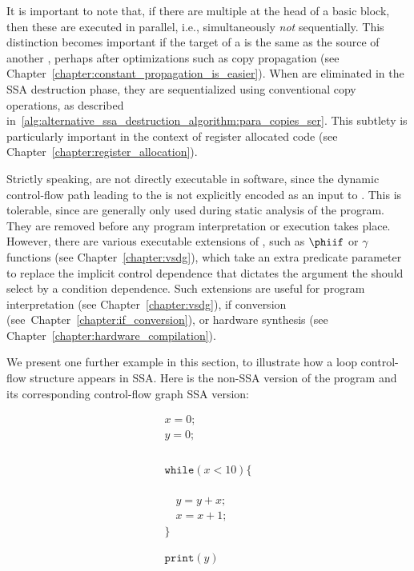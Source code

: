 It is important to note that, if there are multiple \phifuns{} at the head of a basic block, then these are executed in parallel, i.e., simultaneously \textit{not} sequentially. 
This distinction becomes important if the target of a \phifun is the same as the source of another \phifun, perhaps after optimizations such as copy propagation (see Chapter~\ref{chapter:constant_propagation_is_easier}). 
When \phifuns are eliminated in the SSA destruction phase, they are sequentialized using conventional copy operations, as described in~\ref{alg:alternative_ssa_destruction_algorithm:para_copies_ser}. 
This subtlety is particularly important in the context of register allocated code (see Chapter~\ref{chapter:register_allocation}).

Strictly speaking, \phifuns are not directly executable in software, since the dynamic control-flow path leading to the \phifun is not explicitly encoded as an input to \phifun. 
This is tolerable, since \phifuns are generally only used during static analysis of the program. 
They are removed before any program interpretation or execution takes place. 
However, there are various executable extensions of \phifuns, such as $\phiif$ or $\gamma$ functions (see Chapter~\ref{chapter:vsdg}), which take an extra predicate parameter to replace the implicit control dependence that dictates the argument the \phifun should select by a condition dependence. 
Such extensions are useful for program interpretation (see Chapter~\ref{chapter:vsdg}), if conversion (see~Chapter~\ref{chapter:if_conversion}), or hardware synthesis (see Chapter~\ref{chapter:hardware_compilation}).

We present one further example in this section, to illustrate how a loop control-flow structure appears in SSA. 
Here is the non-SSA version of the program and its corresponding control-flow graph SSA version:
\medskip

\begin{minipage}{0.5\textwidth}
\begin{equation*}
\begin{array}{l}
x = 0;\\
y = 0;\\
~\\\\\\\\
\texttt{while} (x < 10) \{\\
~\\\\\\
\quad  y = y + x;\\
\quad  x = x + 1;\\
\}\\
~\\\\
\texttt{print}(y)
\end{array} 
\end{equation*}
\end{minipage}
\begin{minipage}{0.4\textwidth}
\end{minipage}
\bigskip

